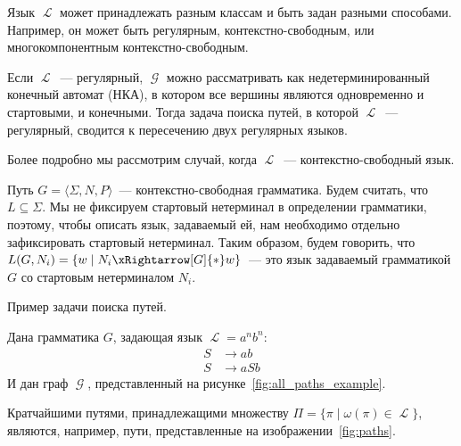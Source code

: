 Язык $\mscrL$ может принадлежать разным классам и быть задан разными способами.
Например, он может быть регулярным, контекстно-свободным, или многокомпонентным контекстно-свободным.

Если $\mscrL$~--- регулярный, $\mscrG$ можно рассматривать как недетерминированный конечный автомат (НКА), в котором все вершины являются одновременно и стартовыми, и конечными.
Тогда задача поиска путей, в которой $\mscrL$~--- регулярный, сводится к пересечению двух регулярных языков.

Более подробно мы рассмотрим случай, когда $\mscrL$~--- контекстно-свободный язык.

Путь $G = \langle \Sigma, N, P \rangle$~--- контекстно-свободная грамматика.
Будем считать, что $L \subseteq \Sigma$.
Мы не фиксируем стартовый нетерминал в определении грамматики, поэтому, чтобы описать язык, задаваемый ей, нам необходимо отдельно зафиксировать стартовый нетерминал.
Таким образом, будем говорить, что $L(G,N_i) = \{ w \mid N_i \xRightarrow[G]{*} w  \}$~--- это язык задаваемый грамматикой $G$ со стартовым нетерминалом $N_i$.

\begin{example}
    Пример задачи поиска путей.

    Дана грамматика $G$, задающая язык $\mscrL = a^n b^n$:
    \begin{align*}
        S & \to a b   \\
        S & \to a S b
    \end{align*}
    И дан граф $\mscrG$, представленный на рисунке~\ref{fig:all_paths_example}.
\begin{marginfigure}
    \begin{center}
        
    \end{center}
    \caption{Входной граф}
    \label{fig:all_paths_example}
\end{marginfigure}

    Кратчайшими путями, принадлежащими множеству $\Pi = \{\pi \mid \omega(\pi) \in \mscrL\}$, являются, например, пути, представленные на изображении~\ref{fig:paths}.

\begin{marginfigure}
    \begin{center}
        
        
    \end{center}
    \caption{Примеры путей}
    \label{fig:paths}
\end{marginfigure}

\end{example}
